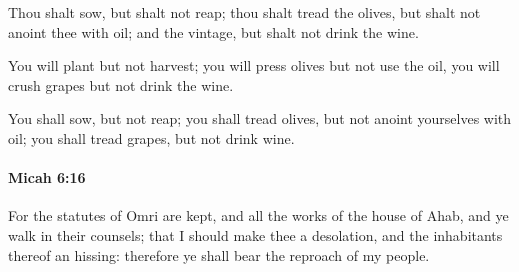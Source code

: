			\begin{versebox}
					\item[BHS] 
					\item[LXX] 
					\item[ASV] Thou shalt sow, but shalt not reap; thou shalt tread the olives, but shalt not anoint thee with oil; and the vintage, but shalt not drink the wine.
					\item[NIV] You will plant but not harvest; you will press olives but not use the oil, you will crush grapes but not drink the wine.
					\item[NRSV] You shall sow, but not reap; you shall tread olives, but not anoint yourselves with oil; you shall tread grapes, but not drink wine.
			\end{versebox}

		\paragraph{Micah 6:16} %
			\label{MICAH-6-16}

			For the statutes of Omri are kept, and all the works of the house of Ahab, and ye walk in their counsels; that I should make thee a desolation, and the inhabitants thereof an hissing: therefore ye shall bear the reproach of my people.

